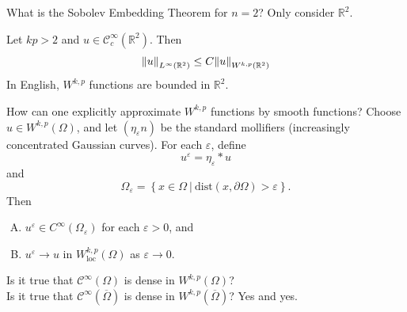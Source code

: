 \documentclass[avery5388,grid,frame]{flashcards}
\newcommand{\E}{\varepsilon}
\def\Rl{\mathbb{R}}
\begin{document}
\begin{flashcard}
    {What is the Sobolev Embedding Theorem for $n=2$?}
    Only consider $\Rl^2$. \vspace{0.4cm}

    Let $kp > 2$ and $u \in \mathcal{C}_c^\infty(\Rl^2)$.  Then
    \begin{align*}
        \norm{u}_{L^\infty(\Rl^2)} \leq C \norm{u}_{W^{k,p}(\Rl^2)}
    \end{align*}
    In English, $W^{k,p}$ functions are bounded in $\Rl^2$.
\end{flashcard}

\begin{flashcard}
    {How can one explicitly approximate $W^{k,p}$ functions by smooth functions?}
    Choose $u \in W^{k,p}(\Omega)$, and let $(\eta_\E{n})$ be the standard mollifiers (increasingly concentrated Gaussian curves).  For each $\E$, define $$u^\E = \eta_\E * u$$ and $$\Omega_\E = \left\{x \in \Omega\ |\ \text{dist}(x,\partial\Omega)> \E\right\}.$$  Then
    \begin{enumerate}[(A)]
        \item $u^\E \in C^\infty(\Omega_\E)$ for each $\E > 0$, and
        \item $u^\E \rightarrow u$ in $W^{k,p}_\text{loc}(\Omega)$ as $\E \rightarrow 0$.
    \end{enumerate}
\end{flashcard}

\begin{flashcard}
    {Is it true that $\mathcal{C}^\infty(\Omega)$ is dense in $W^{k,p}(\Omega)$? \\ \vspace{.2cm}
    Is it true that $\mathcal{C}^\infty(\overline{\Omega})$ is dense in $W^{k,p}(\overline{\Omega})$?}
    Yes and yes.
\end{flashcard}
\end{document}
